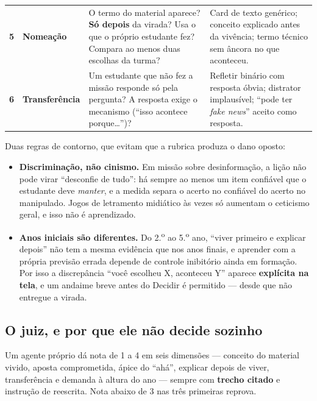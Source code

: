 \documentclass[11pt,a4paper]{article}
\begin{document}
\begin{center}
\begin{longtable}{p{0.55cm}p{3.0cm}p{5.6cm}p{5.4cm}}
\addlinespace
\sffamily\bfseries\color{unLavanda}5 & \sffamily\bfseries\footnotesize\color{unNavy}Nomeação & \footnotesize O termo do material aparece? \textbf{Só depois} da virada? Usa o que o próprio estudante fez? Compara ao menos duas escolhas da turma? & \footnotesize Card de texto genérico; conceito explicado antes da vivência; termo técnico sem âncora no que aconteceu. \\
\addlinespace
\sffamily\bfseries\color{unLavanda}6 & \sffamily\bfseries\footnotesize\color{unNavy}Transferência & \footnotesize Um estudante que não fez a missão responde só pela pergunta? A resposta exige o mecanismo (``isso acontece porque\ldots'')? & \footnotesize Refletir binário com resposta óbvia; distrator implausível; ``pode ter \emph{fake news}'' aceito como resposta. \\
\bottomrule
\end{longtable}
\end{center}

Duas regras de contorno, que evitam que a rubrica produza o dano oposto:

\begin{itemize}
  \item \textbf{Discriminação, não cinismo.} Em missão sobre desinformação, a lição não pode virar ``desconfie de tudo'': há sempre ao menos um item confiável que o estudante deve \emph{manter}, e a medida separa o acerto no confiável do acerto no manipulado. Jogos de letramento midiático às vezes só aumentam o ceticismo geral, e isso não é aprendizado.
  \item \textbf{Anos iniciais são diferentes.} Do 2.\textsuperscript{o} ao 5.\textsuperscript{o} ano, ``viver primeiro e explicar depois'' não tem a mesma evidência que nos anos finais, e aprender com a própria previsão errada depende de controle inibitório ainda em formação. Por isso a discrepância ``você escolheu X, aconteceu Y'' aparece \textbf{explícita na tela}, e um andaime breve antes do Decidir é permitido --- desde que não entregue a virada.
\end{itemize}

\subsection{O juiz, e por que ele não decide sozinho}

Um agente próprio dá nota de 1 a 4 em seis dimensões --- conceito do material vivido, aposta comprometida, ápice do ``ahá'', explicar depois de viver, transferência e demanda à altura do ano --- sempre com \textbf{trecho citado} e instrução de reescrita. Nota abaixo de 3 nas três primeiras reprova.
\end{document}
